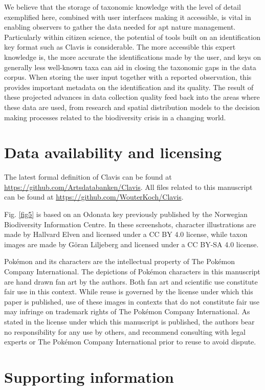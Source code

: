 \documentclass[10pt,letterpaper]{article}
\begin{document}
We believe that the storage of taxonomic knowledge with the level of detail exemplified here, combined with user interfaces making it accessible, is vital in enabling observers to gather the data needed for apt nature management. Particularly within citizen science, the potential of tools built on an identification key format such as Clavis is considerable. The more accessible this expert knowledge is, the more accurate the identifications made by the user, and keys on generally less well-known taxa can aid in closing the taxonomic gaps in the data corpus. When storing the user input together with a reported observation, this provides important metadata on the identification and its quality. The result of these projected advances in data collection quality feed back into the areas where these data are used, from research and spatial distribution models to the decision making processes related to the biodiversity crisis in a changing world.

\section*{
Data availability and licensing
}
The latest formal definition of Clavis can be found at \url{https://github.com/Artsdatabanken/Clavis}. All files related to this manuscript can be found at \url{https://github.com/WouterKoch/Clavis}.

Fig. \ref{fig5} is based on an Odonata key previously published by the Norwegian Biodiversity Information Centre. In these screenshots, character illustrations are made by Hallvard Elven and licensed under a CC BY 4.0 license, while taxon images are made by Göran Liljeberg and licensed under a CC BY-SA 4.0 license.

Pokémon and its characters are the intellectual property of The Pokémon Company International. The depictions of Pokémon characters in this manuscript are hand drawn fan art by the authors. Both fan art and scientific use constitute fair use in this context. While reuse is governed by the license under which this paper is published, use of these images in contexts that do not constitute fair use may infringe on trademark rights of The Pokémon Company International. As stated in the license under which this manuscript is published, the authors bear no responsibility for any use by others, and recommend consulting with legal experts or The Pokémon Company International prior to reuse to avoid dispute.

\section*{
Supporting information
}
\end{document}
